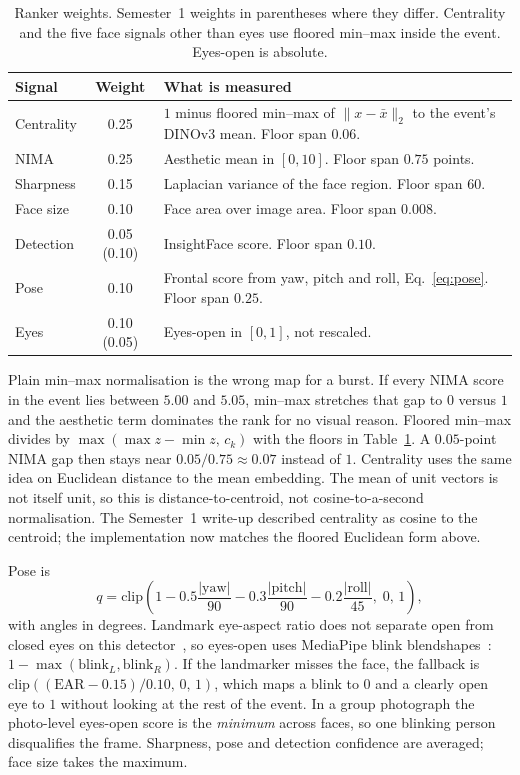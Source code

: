 \documentclass[conference]{IEEEtran}
\begin{document}
\begin{table}[t]
\caption{Ranker weights. Semester~1 weights in parentheses where they differ.
Centrality and the five face signals other than eyes use floored min--max
inside the event. Eyes-open is absolute.}
\label{tab:weights}
\centering
\scriptsize
\begin{tabular}{@{}lcp{4.15cm}@{}}
\toprule
Signal & Weight & What is measured \\
\midrule
Centrality & 0.25 & $1$ minus floored min--max of
$\lVert x - \bar{x}\rVert_2$ to the event's \mbox{DINOv3} mean.
Floor span $0.06$. \\
NIMA & 0.25 & Aesthetic mean in $[0,10]$. Floor span $0.75$ points. \\
Sharpness & 0.15 & Laplacian variance of the face region.
Floor span $60$. \\
Face size & 0.10 & Face area over image area. Floor span $0.008$. \\
Detection & 0.05 {\scriptsize(0.10)} & InsightFace score. Floor span $0.10$. \\
Pose & 0.10 & Frontal score from yaw, pitch and roll,
Eq.~\eqref{eq:pose}. Floor span $0.25$. \\
Eyes & 0.10 {\scriptsize(0.05)} & Eyes-open in $[0,1]$, not rescaled.
\\
\bottomrule
\end{tabular}
\end{table}

Plain min--max normalisation is the wrong map for a burst. If every NIMA score
in the event lies between $5.00$ and $5.05$, min--max stretches that gap to
$0$ versus $1$ and the aesthetic term dominates the rank for no visual reason.
Floored min--max divides by $\max(\max z - \min z,\, c_k)$ with the floors in
Table~\ref{tab:weights}. A $0.05$-point NIMA gap then stays near
$0.05/0.75\approx 0.07$ instead of $1$. Centrality uses the same idea on
Euclidean distance to the mean embedding. The mean of unit vectors is not
itself unit, so this is distance-to-centroid, not cosine-to-a-second
normalisation. The Semester~1 write-up described centrality as cosine to the
centroid; the implementation now matches the floored Euclidean form above.

Pose is
\begin{equation}
q = \mathrm{clip}\!\left(
1 - 0.5\frac{|\mathrm{yaw}|}{90}
  - 0.3\frac{|\mathrm{pitch}|}{90}
  - 0.2\frac{|\mathrm{roll}|}{45},\;
0,\,1\right),
\label{eq:pose}
\end{equation}
with angles in degrees. Landmark eye-aspect ratio does not separate open from
closed eyes on this detector~\cite{soukupova2016eye}, so eyes-open uses
MediaPipe blink blendshapes~\cite{lugaresi2019mediapipe}:
$1-\max(\mathrm{blink}_L,\mathrm{blink}_R)$. If the landmarker misses the face,
the fallback is $\mathrm{clip}((\mathrm{EAR}-0.15)/0.10,\,0,\,1)$, which maps
a blink to $0$ and a clearly open eye to $1$ without looking at the rest of
the event. In a group photograph the photo-level eyes-open score is the
\emph{minimum} across faces, so one blinking person disqualifies the frame.
Sharpness, pose and detection confidence are averaged; face size takes the
maximum.
\end{document}
